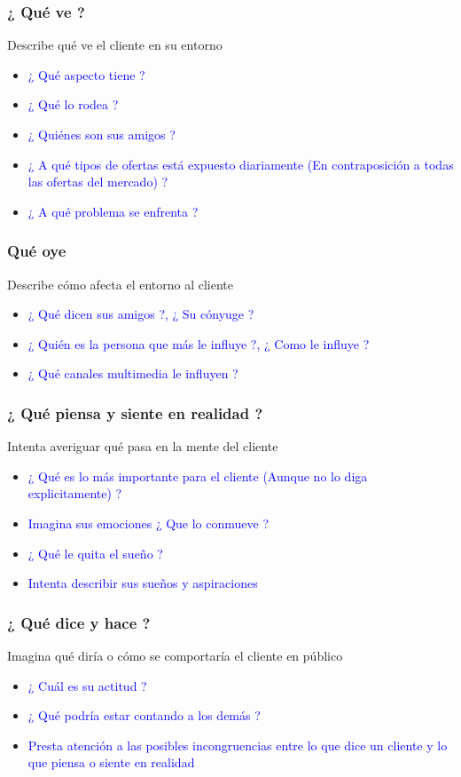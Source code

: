 \documentclass[11pt]{book}
\begin{document}
\subsubsection{¿ Qué ve ?}
Describe qué ve el cliente en su entorno
\begin{itemize}
\item\textcolor{blue}{¿ Qué aspecto tiene ?}
\item\textcolor{blue}{¿ Qué lo rodea ?}
\item\textcolor{blue}{¿ Quiénes son sus amigos ?}
\item\textcolor{blue}{¿ A qué tipos de ofertas está expuesto diariamente (En contraposición a todas las ofertas del mercado) ?}
\item\textcolor{blue}{¿ A qué problema se enfrenta ?}
\end{itemize}

\subsubsection{Qué oye}
Describe cómo afecta el entorno al cliente
\begin{itemize}
\item\textcolor{blue}{¿ Qué dicen sus amigos  ?, ¿ Su cónyuge ?}
\item\textcolor{blue}{¿ Quién es la persona que más le influye ?, ¿ Como le influye ?}
\item\textcolor{blue}{¿ Qué canales multimedia le influyen ?}
\end{itemize}
\subsubsection{¿ Qué piensa y siente en realidad ?}
Intenta averiguar qué pasa en la mente del cliente
\begin{itemize}
\item\textcolor{blue}{¿ Qué es lo más importante para el cliente (Aunque no lo diga explicitamente) ?}
\item\textcolor{blue}{Imagina sus emociones ¿ Que lo conmueve ?}
\item\textcolor{blue}{¿ Qué le quita el sueño ?}
\item\textcolor{blue}{ Intenta describir sus sueños y aspiraciones }
\end{itemize}
\subsubsection{¿ Qué dice y hace ?}
Imagina qué diría o cómo se comportaría el cliente en público
\begin{itemize}
\item\textcolor{blue}{¿ Cuál es su actitud ?}
\item\textcolor{blue}{¿ Qué podría estar contando a los demás ?}
\item\textcolor{blue}{Presta atención a las posibles incongruencias entre lo que dice un cliente y lo que piensa o siente en realidad }
\end{itemize}
\end{document}
